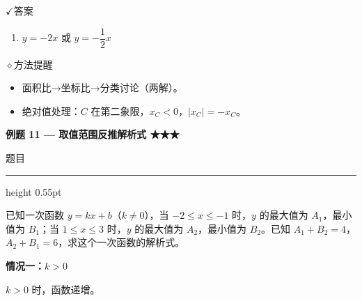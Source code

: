 \documentclass{exam-zh}
\newcommand{\eduSectionTitle}[1]{%
  \needspace{5\baselineskip}%
  \vspace{2mm}
  {\color{edu-blue}\bfseries\large #1}\par
  \vspace{3mm}
}
\newenvironment{eduSubQuestionItem}[1]{%
  \needspace{4\baselineskip}%
  \vspace{2mm}
  \par\noindent
  \hangindent=8mm\hangafter=1
  {\color{edu-blue}\bfseries #1}\enspace
  \begingroup
  \color{edu-ink}
}{%
  \endgroup
  \par
  \vspace{3mm}
}
\newcommand{\eduIconCheck}{\(\checkmark\)}
\newcommand{\eduIconPin}{\(\diamond\)}
\newenvironment{eduProblemBlock}[1][题目]{%
  \needspace{8\baselineskip}
  {\small\color{edu-muted}#1}\par
  \vspace{1.5mm}
  {\color{edu-blue}\hrule height 0.55pt}
  \vspace{4.5mm}
  \begingroup
  \color{edu-ink}
  \large
  \setlength{\parskip}{2.2mm}
  \linespread{1.20}\selectfont
}{%
  \par
  \endgroup
  \vspace{6mm}
}
\newenvironment{eduBulletList}{%
  \begin{itemize}[
    label=\textbullet,
    leftmargin=5mm,
    itemsep=1.2mm,
    topsep=0pt,
    parsep=0pt
  ]
}{%
  \end{itemize}
}
\newenvironment{eduBottomGrid}{%
  \vspace{1mm}
  \par\noindent
}{%
  \par\vspace{1mm}
}
\newenvironment{eduSummaryLeft}{%
  \begin{minipage}[t]{0.30\linewidth}
}{%
  \end{minipage}
}
\newcommand{\eduSummaryDivider}{%
  \hspace{4mm}{\color{edu-line}\vrule width 0.35pt}\hspace{7mm}%
}
\newenvironment{eduSummaryRight}{%
  \begin{minipage}[t]{0.58\linewidth}
}{%
  \end{minipage}
}
\newenvironment{eduPlainList}{%
  \begin{enumerate}[
    label=(\arabic*),
    leftmargin=7mm,
    itemsep=1.2mm,
    topsep=0pt,
    parsep=0pt
  ]
}{%
  \end{enumerate}
}
\begin{document}
\begin{eduBottomGrid}
  \begin{eduSummaryLeft}
    \begin{eduSummaryBlock}{\eduIconCheck}{答案}
    \begin{eduPlainList}
      \item $y = -2x$ 或 $y = -\dfrac{1}{2}x$    \end{eduPlainList}
    \end{eduSummaryBlock}
  \end{eduSummaryLeft}
  \eduSummaryDivider
  \begin{eduSummaryRight}
    \begin{eduSummaryBlock}{\eduIconPin}{方法提醒}
    \begin{eduBulletList}
      \item 面积比→坐标比→分类讨论（两解）。      \item 绝对值处理：$C$ 在第二象限，$x_C < 0$，$|x_C| = -x_C$。    \end{eduBulletList}
    \end{eduSummaryBlock}
  \end{eduSummaryRight}
\end{eduBottomGrid}



\eduSectionTitle{例题 11 — 取值范围反推解析式 ★★★}

\begin{eduProblemBlock}[题目]
已知一次函数 $y = kx + b$（$k \neq 0$），当 $-2 \leq x \leq -1$ 时，$y$ 的最大值为 $A_1$，最小值为 $B_1$；当 $1 \leq x \leq 3$ 时，$y$ 的最大值为 $A_2$，最小值为 $B_2$。已知 $A_1 + B_2 = 4$，$A_2 + B_1 = 6$，求这个一次函数的解析式。
\end{eduProblemBlock}





\begin{eduSubQuestionItem}{情况一：$k > 0$}
$k > 0$ 时，函数递增。\end{eduSubQuestionItem}
\end{document}
